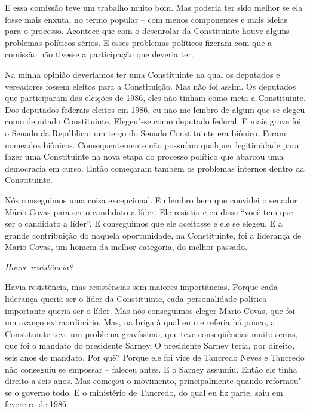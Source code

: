 E essa comissão teve um trabalho muito bom. Mas poderia ter sido melhor
se ela fosse mais enxuta, no termo popular -- com menos componentes e
mais ideias para o processo. Acontece que com o desenrolar da
Constituinte houve alguns problemas políticos sérios. E esses problemas
políticos fizeram com que a comissão não tivesse a participação que
deveria ter.

Na minha opinião deveríamos ter uma Constituinte na qual os deputados e
vereadores fossem eleitos para a Constituição. Mas não foi assim. Os
deputados que participaram das eleições de 1986, eles não tinham como
meta a Constituinte. Dos deputados federais eleitos em 1986, eu não me
lembro de algum que se elegeu como deputado Constituinte. Elegeu"-se como
deputado federal. E mais grave foi o Senado da República: um terço do
Senado Constituinte era biônico. Foram nomeados biônicos.
Consequentemente não possuíam qualquer legitimidade para fazer uma
Constituinte na nova etapa do processo político que abarcou uma
democracia em curso. Então começaram também os problemas internos dentro
da Constituinte.

Nós conseguimos uma coisa excepcional. Eu lembro bem que convidei o
senador Mário Covas para ser o candidato a líder. Ele resistiu e eu
disse ``você tem que ser o candidato a líder''. E conseguimos que ele
aceitasse e ele se elegeu. E a grande contribuição do  naquela
oportunidade, na Constituinte, foi a liderança de Mario Covas, um homem
da melhor categoria, do melhor passado.

\medskip

\emph{Houve resistência?}

Havia resistência, mas resistências sem maiores
importâncias. Porque cada liderança queria ser o líder da Constituinte,
cada personalidade política importante queria ser o líder. Mas nós
conseguimos eleger Mario Covas, que foi um avanço extraordinário. Mas,
na briga à qual eu me referia há pouco, a Constituinte teve um problema
gravíssimo, que teve conseqüências muito serias, que foi o mandato do
presidente Sarney. O presidente Sarney teria, por direito, seis anos de
mandato. Por quê? Porque ele foi vice de Tancredo Neves e Tancredo não
conseguiu se empossar -- faleceu antes. E o Sarney assumiu. Então ele
tinha direito a seis anos. Mas começou o movimento, principalmente
quando reformou"-se o governo todo. E o ministério de Tancredo, do qual
eu fiz parte, saiu em fevereiro de 1986.

